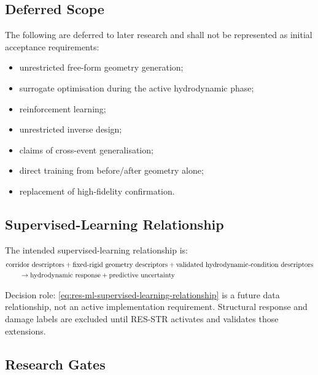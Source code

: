 \documentclass[12pt,a4paper]{article}
\begin{document}
\subsection{Deferred Scope}
\label{sec:res-ml-deferred-scope}

The following are deferred to later research and shall not be represented as
initial acceptance requirements:
\begin{itemize}
  \item unrestricted free-form geometry generation;
  \item surrogate optimisation during the active hydrodynamic phase;
  \item reinforcement learning;
  \item unrestricted inverse design;
  \item claims of cross-event generalisation;
  \item direct training from before/after geometry alone;
  \item replacement of high-fidelity confirmation.
\end{itemize}

\subsection{Supervised-Learning Relationship}
\label{sec:res-ml-supervised-learning-relationship}

The intended supervised-learning relationship is:
\begin{align}
  &\text{corridor descriptors}
  + \text{fixed-rigid geometry descriptors}
  + \text{validated hydrodynamic-condition descriptors}
  \notag\\
  &\qquad \rightarrow
  \text{hydrodynamic response}
  + \text{predictive uncertainty}
  \label{eq:res-ml-supervised-learning-relationship}
\end{align}

Decision role: \cref{eq:res-ml-supervised-learning-relationship} is a
future data relationship, not an active implementation requirement.
Structural response and damage labels are excluded until RES-STR
activates and validates those extensions.

\subsection{Research Gates}
\label{sec:res-ml-research-gates}
\end{document}
